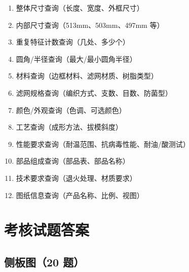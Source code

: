 \documentclass[11pt,a4paper]{article}
\begin{document}
\begin{enumerate}[nosep]
  \item 整体尺寸查询（长度、宽度、外框尺寸）
  \item 内部尺寸查询（513mm、503mm、497mm 等）
  \item 重复特征计数查询（几处、多少个）
  \item 圆角/半径查询（最大/最小圆角半径）
  \item 材料查询（边框材料、滤网材质、树脂类型）
  \item 滤网规格查询（编织方式、支数、目数、防菌型）
  \item 颜色/外观查询（色调、可选颜色）
  \item 工艺查询（成形方法、拔模斜度）
  \item 性能要求查询（耐温范围、抗病毒性能、耐油/酸测试）
  \item 部品组成查询（部品表、部品名称）
  \item 技术要求查询（退火处理、材质要求）
  \item 图纸信息查询（产品名称、比例、视图）
\end{enumerate}

\section{考核试题答案}

\subsection{侧板图（20 题）}
\end{document}

